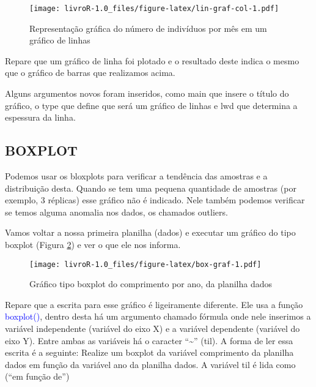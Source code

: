 \documentclass[titlepage, oneside, openany, a4paper]{book}
\newenvironment{Shaded}{\begin{snugshade}}{\end{snugshade}}
\newcommand{\DataTypeTok}[1]{\textcolor[rgb]{0.13,0.29,0.53}{#1}}
\newcommand{\KeywordTok}[1]{\textcolor[rgb]{0.13,0.29,0.53}{\textbf{#1}}}
\newcommand{\NormalTok}[1]{#1}
\newcommand{\OperatorTok}[1]{\textcolor[rgb]{0.81,0.36,0.00}{\textbf{#1}}}
\newcommand{\StringTok}[1]{\textcolor[rgb]{0.31,0.60,0.02}{#1}}
\begin{document}
\begin{figure}
\centering
\texttt{[image: livroR-1.0\_files/figure-latex/lin-graf-col-1.pdf]}
\caption{\label{fig:lin-graf-col}Representação gráfica do número de indivíduos por mês em um gráfico de linhas}
\end{figure}

Repare que um gráfico de linha foi plotado e o resultado deste indica o mesmo que o gráfico de barras que realizamos acima.

Alguns argumentos novos foram inseridos, como main que insere o título do gráfico, o type que define que será um gráfico de linhas e lwd que determina a espessura da linha.

\hypertarget{boxplot}{%
\subsection{BOXPLOT}\label{boxplot}}

Podemos usar os bloxplots para verificar a tendência das amostras e a distribuição desta. Quando se tem uma pequena quantidade de amostras (por exemplo, 3 réplicas) esse gráfico não é indicado. Nele também podemos verificar se temos alguma anomalia nos dados, os chamados outliers.

Vamos voltar a nossa primeira planilha (dados) e executar um gráfico do tipo boxplot (Figura \ref{fig:box-graf}) e ver o que ele nos informa.

\begin{Shaded}
\end{Shaded}

\begin{figure}
\centering
\texttt{[image: livroR-1.0\_files/figure-latex/box-graf-1.pdf]}
\caption{\label{fig:box-graf}Gráfico tipo boxplot do comprimento por ano, da planilha dados}
\end{figure}

Repare que a escrita para esse gráfico é ligeiramente diferente. Ele usa a função \textcolor{blue}{boxplot()}, dentro desta há um argumento chamado fórmula onde nele inserimos a variável independente (variável do eixo X) e a variável dependente (variável do eixo Y). Entre ambas as variáveis há o caracter ``\textasciitilde{}'' (til). A forma de ler essa escrita é a seguinte: Realize um boxplot da variável comprimento da planilha dados em função da variável ano da planilha dados. A variável til é lida como (``em função de'')
\end{document}
